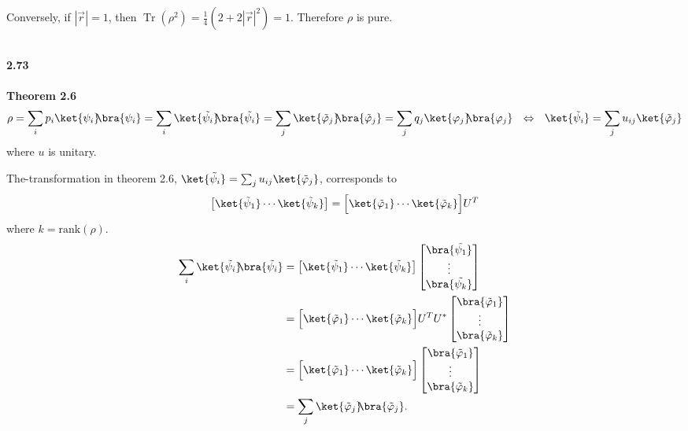 \documentclass[10pt]{book}
\DeclareMathOperator{\Tr}{Tr}
\newcommand{\kb}[1]{\ket{#1}\hspace{-1mm} \bra{#1}} %
\newcommand{\Textbf}[1]{\hspace{3mm}\\ \textbf{#1}\\}
\begin{document}
	Conversely, if $|\vec{r}| = 1$, then $\Tr (\rho^2) = \frac{1}{4} (2 + 2|\vec{r}|^2) = 1$. Therefore $\rho$ is pure.
	
	
	
	
	\Textbf{2.73}
	
		\Textbf{Theorem 2.6}
		\begin{equation}
\begin{aligned}
			\rho = \sum_i p_i \kb{\psi_i}
			= \sum_i \kb{\tilde{\psi_i}}
			= \sum_j \kb{\tilde{\varphi}_j}
			= \sum_j q_j \kb{\varphi_j}
			~~ \Leftrightarrow ~~
			\ket{\tilde{\psi}_i} = \sum_j u_{ij} \ket{\tilde{\varphi}_j}
		\end{aligned}
\end{equation}
		where $u$ is unitary.
		
		The-transformation in theorem 2.6, $\ket{\tilde{\psi}_i} = \sum_j u_{ij} \ket{\tilde{\varphi}_j}$, corresponds to
		\begin{equation}
\begin{aligned}
			\left[ \ket{\tilde{\psi}_1} \cdots \ket{\tilde{\psi}_k} \right] = \Big[ \ket{\tilde{\varphi}_1} \cdots \ket{\tilde{\varphi}_k} \Big] U^T
		\end{aligned}
\end{equation}
		where $k = \mathrm{rank} (\mathcal{\rho})$.
\begin{equation}
			\begin{aligned}
		\sum_i \kb{\tilde{\psi_i}} &= \left[ \ket{\tilde{\psi}_1} \cdots \ket{\tilde{\psi}_k} \right]
		\begin{bmatrix}
			\bra{\tilde{\psi_1}}\\
			\vdots\\
			\bra{\tilde{\psi_k}}
		\end{bmatrix}\\
		&= \Big[ \ket{\tilde{\varphi}_1} \cdots \ket{\tilde{\varphi}_k} \Big] U^T
		U^* \begin{bmatrix}
			\bra{\tilde{\varphi}_1}\\
			\vdots\\
			\bra{\tilde{\varphi}_k}
		\end{bmatrix}\\
		&= \Big[ \ket{\tilde{\varphi}_1} \cdots \ket{\tilde{\varphi}_k} \Big]
		\begin{bmatrix}
			\bra{\tilde{\varphi}_1}\\
			\vdots\\
			\bra{\tilde{\varphi}_k}
		\end{bmatrix}\\
		&= \sum_j \kb{\tilde{\varphi}_j}.
	\end{aligned}
\end{equation}
	
\end{document}
